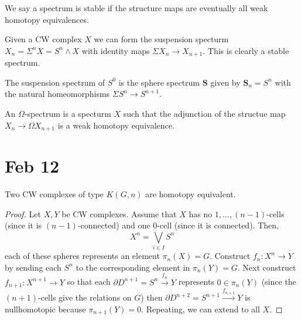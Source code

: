 \documentclass[12pt]{extarticle}
\begin{document}
\begin{definition}
We say a spectrum is stable if the structure maps are eventually all weak homotopy equivalences. 
\end{definition}

\begin{example}
Given a CW complex $X$ we can form the suspension specturm $X_n = \Sigma^n X = S^n \wedge X$ with identity maps $\Sigma X_n \to X_{n+1}$. This is clearly a stable spectrum.
\end{example}

\renewcommand{\S}{\mathbf{S}}

\begin{example}
The suspension spectrum of $S^0$ is the sphere spectrum $\S$ given by $\S_n = S^n$ with the natural homeomorphisms $\Sigma S^n \to S^{n+1}$. 
\end{example}

\begin{definition}
An $\Omega$-spectrum is a specturm $X$ such that the adjunction of the structue map $X_n \to \Omega X_{n+1}$ is a weak homotopy equivalence. 
\end{definition}

\section{Feb 12}

\begin{theorem}
Two CW complexes of type $K(G, n)$ are homotopy equivalent.
\end{theorem}

\begin{proof}
Let $X, Y$ be CW complexes. Assume that $X$ has no $1, \dots, (n-1)$-cells (since it is $(n-1)$-connected) and one $0$-cell (since it is connected). Then,
\[ X^n = \bigvee_{i \in I} S^n \]
each of these spheres represents an element $\pi_n(X) = G$. Construct $f_n : X^n \to Y$ by sending each $S^n$ to the corresponding element in $\pi_n(Y) = G$. Next construct $f_{n+1} : X^{n+1} \to Y$ so that each $\partial D^{n+1} = S^n \xrightarrow{f_n} Y$ represents $0 \in \pi_n(Y)$ (since the $(n+1)$-cells give the relations on $G$) then $\partial D^{n+2} = S^{n+1} \xrightarrow{f_{n+1}} Y$ is nullhomotopic because $\pi_{n+1}(Y) = 0$. Repeating, we can extend to all $X$. 
\end{proof}
\end{document}
